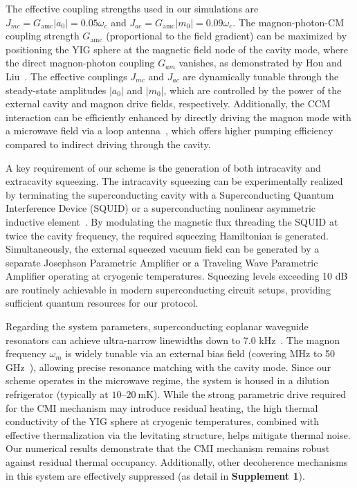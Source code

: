 \documentclass[aps, prresearch, reprint, nofootinbib, longbibliography]{revtex4-2}
\begin{document}
The effective coupling strengths used in our simulations are $J_{mc} =G_{\text{amc}}|a_0|= 0.05\omega_c$ and $J_{ac} = G_{\text{amc}}|m_0| = 0.09\omega_c$.
The magnon-photon-CM coupling strength $ G_{\text{amc}}$ (proportional to the field gradient) can be maximized by positioning the YIG sphere at the magnetic field node of the cavity mode, where  the direct magnon-photon coupling $G_{am}$ vanishes, as demonstrated
by Hou and Liu~\cite{PhysRevLett.123.107702}. The effective couplings $J_{mc}$ and $J_{ac}$ are dynamically tunable through the steady-state amplitudes $|a_0|$ and $|m_0|$, which are controlled by the power of the external cavity and magnon drive fields, respectively.
Additionally, the CCM interaction can be efficiently enhanced by directly driving the magnon mode with a microwave field via a loop antenna~\cite{PhysRevLett.120.057202}, which offers higher pumping efficiency compared to indirect driving through the cavity.


A key requirement of our scheme is the generation of both intracavity and extracavity squeezing. The intracavity squeezing can be experimentally realized by terminating the superconducting cavity with a Superconducting Quantum Interference Device (SQUID) or a superconducting nonlinear asymmetric inductive element~\cite{PhysRevA.111.013709,PhysRevLett.119.023602,PhysRevX.7.041011}. %
By modulating the magnetic flux threading the SQUID at twice the cavity frequency, the required squeezing Hamiltonian is generated. Simultaneously, the external squeezed vacuum field can be generated by a separate Josephson Parametric Amplifier or a Traveling Wave Parametric Amplifier operating at cryogenic temperatures. Squeezing levels exceeding 10 dB are routinely achievable in modern superconducting circuit setups, providing sufficient quantum resources for our protocol.





Regarding the system parameters, superconducting coplanar waveguide resonators can achieve ultra-narrow linewidths down to 7.0 kHz~\cite{PhysRevLett.103.043603}.
The magnon frequency $\omega_m$ is widely tunable via an external bias field (covering MHz to 50 GHz~\cite{PhysRevLett.113.156401}), allowing precise resonance matching with the cavity mode.
Since our scheme operates in the microwave regime, the system is housed in a dilution refrigerator (typically at $10\text{--}20~\text{mK}$). While the strong parametric drive required for the CMI mechanism may introduce residual heating, the high thermal conductivity of the YIG sphere at cryogenic temperatures, combined with effective thermalization via the levitating structure, helps mitigate thermal noise. Our numerical results demonstrate that the CMI mechanism remains robust against residual thermal occupancy. Additionally, other decoherence mechanisms in this system are effectively suppressed (as detail in \textbf{Supplement 1}). 
\end{document}
